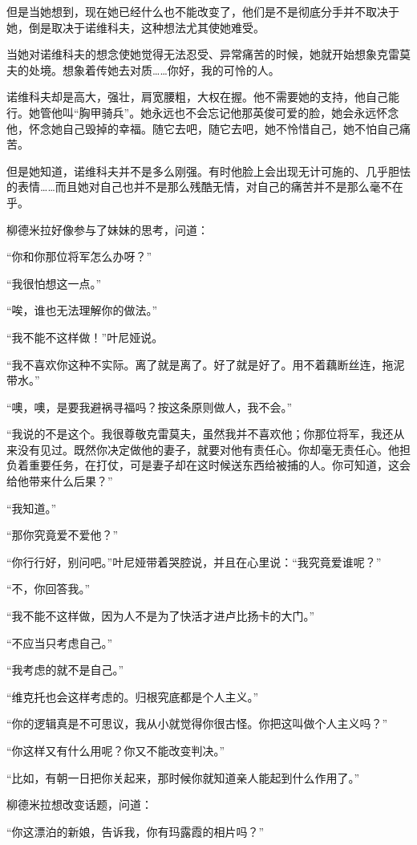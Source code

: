 但是当她想到，现在她已经什么也不能改变了，他们是不是彻底分手并不取决于她，倒是取决于诺维科夫，这种想法尤其使她难受。

当她对诺维科夫的想念使她觉得无法忍受、异常痛苦的时候，她就开始想象克雷莫夫的处境。想象着传她去对质……你好，我的可怜的人。

诺维科夫却是高大，强壮，肩宽腰粗，大权在握。他不需要她的支持，他自己能行。她管他叫“胸甲骑兵”。她永远也不会忘记他那英俊可爱的脸，她会永远怀念他，怀念她自己毁掉的幸福。随它去吧，随它去吧，她不怜惜自己，她不怕自己痛苦。

但是她知道，诺维科夫并不是多么刚强。有时他脸上会出现无计可施的、几乎胆怯的表情……而且她对自己也并不是那么残酷无情，对自己的痛苦并不是那么毫不在乎。

柳德米拉好像参与了妹妹的思考，问道：

“你和你那位将军怎么办呀？”

“我很怕想这一点。”

“唉，谁也无法理解你的做法。”

“我不能不这样做！”叶尼娅说。

“我不喜欢你这种不实际。离了就是离了。好了就是好了。用不着藕断丝连，拖泥带水。”

“噢，噢，是要我避祸寻福吗？按这条原则做人，我不会。”

“我说的不是这个。我很尊敬克雷莫夫，虽然我并不喜欢他；你那位将军，我还从来没有见过。既然你决定做他的妻子，就要对他有责任心。你却毫无责任心。他担负着重要任务，在打仗，可是妻子却在这时候送东西给被捕的人。你可知道，这会给他带来什么后果？”

“我知道。”

“那你究竟爱不爱他？”

“你行行好，别问吧。”叶尼娅带着哭腔说，并且在心里说：“我究竟爱谁呢？”

“不，你回答我。”

“我不能不这样做，因为人不是为了快活才进卢比扬卡的大门。”

“不应当只考虑自己。”

“我考虑的就不是自己。”

“维克托也会这样考虑的。归根究底都是个人主义。”

“你的逻辑真是不可思议，我从小就觉得你很古怪。你把这叫做个人主义吗？”

“你这样又有什么用呢？你又不能改变判决。”

“比如，有朝一日把你关起来，那时候你就知道亲人能起到什么作用了。”

柳德米拉想改变话题，问道：

“你这漂泊的新娘，告诉我，你有玛露霞的相片吗？”

